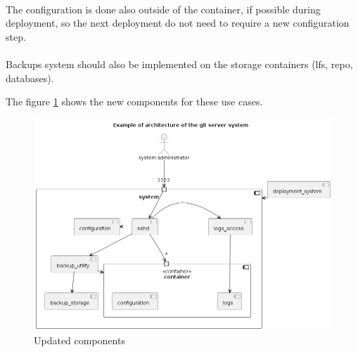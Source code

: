 \paragraph{}
The configuration is done also outside of the container, if possible during deployment, so the next deployment do not need to require a new configuration step.

\paragraph{}
Backups system should also be implemented on the storage containers (lfs, repo, databases). 

The figure \ref{fig:components_v2} shows the new components for these use cases. 

\begin{figure}[ht]
    \centering
    \includegraphics[width=\textwidth]{iteration_02/diagrams/components.png}
    \caption{Updated components}
    \label{fig:components_v2}
\end{figure}

